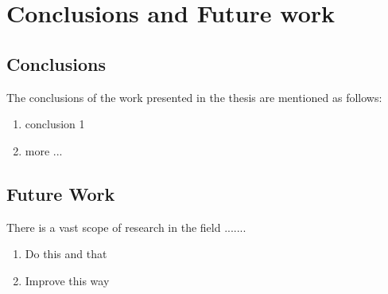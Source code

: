 
\chapter{Conclusions and Future work} %

\label{Chapter6} %



\section{Conclusions}

The conclusions of the work presented in the thesis are mentioned as follows:
 
\begin{enumerate}
\item conclusion 1
\item more ... 
\end{enumerate}


\section{Future Work}
There is a vast scope of research in the field .......

\begin{enumerate}
\item Do this and that
\item Improve this way
\end{enumerate}
